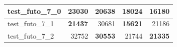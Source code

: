 \documentclass{article}
\begin{document}
\begin{table}[H]
\begin{center}
\begin{tabular}{|l|r|r|r|r|}
				test\_futo\_7\_0 & 23030                                  & \textbf{20638}                              & 18024                                  & \textbf{16180}                              \\ \hline
				test\_futo\_7\_1 & \textbf{21437}                         & 30681                                       & \textbf{15621}                         & 21186                                       \\ \hline
				test\_futo\_7\_2 & 32752                                  & \textbf{30553}                              & 21744                                  & \textbf{21335}                              \\ \hline
			\end{tabular}
		\end{center}
	\end{table}
\end{document}
